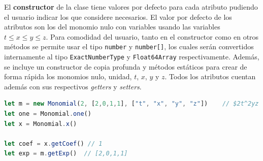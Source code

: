 El \textbf{constructor} de la clase tiene valores por defecto para cada atributo pudiendo el usuario indicar los que considere necesarios. El valor por defecto de los atributos son los del monomio nulo con variables usando las variables $t\le x\le y\le z$. Para comodidad del usuario, tanto en el constructor como en otros métodos se permite usar el tipo \texttt{number} y \texttt{number[]}, los cuales serán convertidos internamente al tipo \texttt{ExactNumberType} y \texttt{Float64Array} respectivamente. Además, se incluye un constructor de copia profunda y métodos estáticos para crear de forma rápida los monomios nulo, unidad, $t$, $x$, $y$ y $z$. Todos los atributos cuentan además con sus respectivos \textit{getters} y \textit{setters}.
\begin{lstlisting}[language=Javascript]
let m = new Monomial(2, [2,0,1,1], ["t", "x", "y", "z"])    // $2t^2yz en Q[t,x,y,z]$
let one = Monomial.one()
let x = Monomial.x()

let coef = x.getCoef() // 1
let exp = m.getExp()  // [2,0,1,1]
\end{lstlisting}

